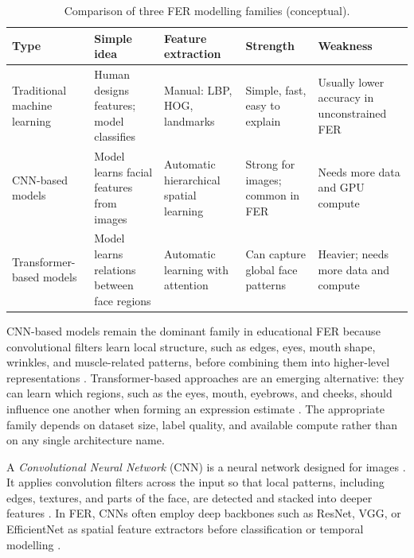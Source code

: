 \begin{table}[htbp]
  \centering
  \caption{Comparison of three FER modelling families (conceptual).}
  \label{tab:fer_model_families}
  \begin{tabular}{@{}p{2.6cm}p{2.4cm}p{3.1cm}p{2.5cm}p{2.5cm}@{}}
    \toprule
    \textbf{Type} & \textbf{Simple idea} & \textbf{Feature extraction} & \textbf{Strength} & \textbf{Weakness} \\
    \midrule
    Traditional machine learning &
    Human designs features; model classifies &
    Manual: LBP, HOG, landmarks &
    Simple, fast, easy to explain &
    Usually lower accuracy in unconstrained FER \\
    \addlinespace
    CNN-based models &
    Model learns facial features from images &
    Automatic hierarchical spatial learning &
    Strong for images; common in FER &
    Needs more data and GPU compute \\
    \addlinespace
    Transformer-based models &
    Model learns relations between face regions &
    Automatic learning with attention &
    Can capture global face patterns &
    Heavier; needs more data and compute \\
    \bottomrule
  \end{tabular}
\end{table}

CNN-based models remain the dominant family in educational FER because convolutional filters learn local structure, such as edges, eyes, mouth shape, wrinkles, and muscle-related patterns, before combining them into higher-level representations \cite{lek_academic_2023,rao_recognition_2021,aly_revolutionizing_2025}. Transformer-based approaches are an emerging alternative: they can learn which regions, such as the eyes, mouth, eyebrows, and cheeks, should influence one another when forming an expression estimate \cite{su_leveraging_2024,liu_dynamic_nodate}. The appropriate family depends on dataset size, label quality, and available compute rather than on any single architecture name.

A \emph{Convolutional Neural Network} (CNN) is a neural network designed for images \cite{aly_revolutionizing_2025}. It applies convolution filters across the input so that local patterns, including edges, textures, and parts of the face, are detected and stacked into deeper features \cite{gupta_edfa_2023,aly_revolutionizing_2025}. In FER, CNNs often employ deep backbones such as ResNet, VGG, or EfficientNet as spatial feature extractors before classification or temporal modelling \cite{he_resnet_2016,asaju_adaptive_2022,komaravalli_detecting_2023,shiri_detection_2024}.

